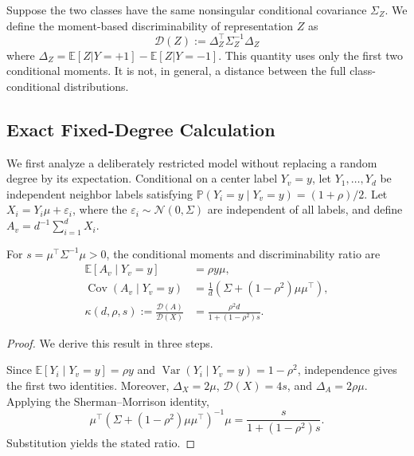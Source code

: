 \begin{definition}
\label{def:discriminability}
Suppose the two classes have the same nonsingular conditional covariance $\Sigma_Z$. We define the moment-based discriminability of representation $Z$ as
\begin{equation}
    \mathcal{D}(Z) := \Delta_Z^\top \Sigma_Z^{-1} \Delta_Z
\end{equation}
where $\Delta_Z = \mathbb{E}[Z|Y=+1] - \mathbb{E}[Z|Y=-1]$. This quantity uses only the first two conditional moments. It is not, in general, a distance between the full class-conditional distributions.
\end{definition}

\subsection{Exact Fixed-Degree Calculation}

We first analyze a deliberately restricted model without replacing a random degree by its expectation. Conditional on a center label $Y_v=y$, let $Y_1,\ldots,Y_d$ be independent neighbor labels satisfying $\mathbb{P}(Y_i=y\mid Y_v=y)=(1+\rho)/2$. Let $X_i=Y_i\mu+\varepsilon_i$, where the $\varepsilon_i\sim\mathcal{N}(0,\Sigma)$ are independent of all labels, and define $A_v=d^{-1}\sum_{i=1}^d X_i$.

\begin{proposition}
\label{prop:fixed_degree}
For $s=\mu^\top\Sigma^{-1}\mu>0$, the conditional moments and discriminability ratio are
\begin{align}
    \mathbb{E}[A_v\mid Y_v=y] &= \rho y\mu,\\
    \operatorname{Cov}(A_v\mid Y_v=y)
        &= \frac{1}{d}\left(\Sigma+(1-\rho^2)\mu\mu^\top\right),\\
    \kappa(d,\rho,s)
        :=\frac{\mathcal{D}(A)}{\mathcal{D}(X)}
        &=\frac{\rho^2d}{1+(1-\rho^2)s}.
\end{align}
\end{proposition}

\begin{proof}
We derive this result in three steps.

Since $\mathbb{E}[Y_i\mid Y_v=y]=\rho y$ and
$\operatorname{Var}(Y_i\mid Y_v=y)=1-\rho^2$, independence gives the first two identities. Moreover, $\Delta_X=2\mu$, $\mathcal{D}(X)=4s$, and $\Delta_A=2\rho\mu$. Applying the Sherman--Morrison identity,
\begin{equation}
 \mu^\top\left(\Sigma+(1-\rho^2)\mu\mu^\top\right)^{-1}\mu
 =\frac{s}{1+(1-\rho^2)s}.
\end{equation}
Substitution yields the stated ratio.
\end{proof}

